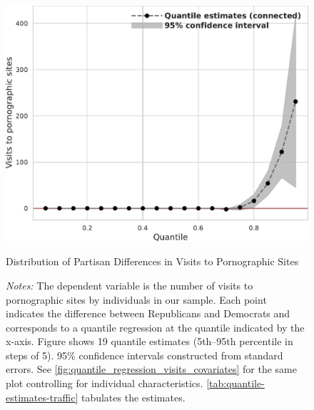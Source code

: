 \documentclass[12pt,twoside]{article}
\begin{document}
\FloatBarrier
\begin{figure}
	\centering
	\includegraphics[width=.6\linewidth]{figs/quantile_reg_visits_adult.pdf}
	\caption{Distribution of Partisan Differences in Visits to Pornographic Sites}
	\caption*{\footnotesize \emph{Notes:} 
		The dependent variable is the number of visits to pornographic sites by individuals in our sample.
		Each point indicates the difference between Republicans and Democrats and corresponds to a quantile regression at the quantile indicated by the x-axis.
  Figure shows 19 quantile estimates (5th--95th percentile in steps of 5).
		95\% confidence intervals constructed from standard errors.
		See \cref{fig:quantile_regression_visits_covariates} for the same plot controlling for individual characteristics.
            \cref{tab:quantile-estimates-traffic} tabulates the estimates.
	}
	\label{fig:quantile_regression_visits}
\end{figure}
\end{document}
